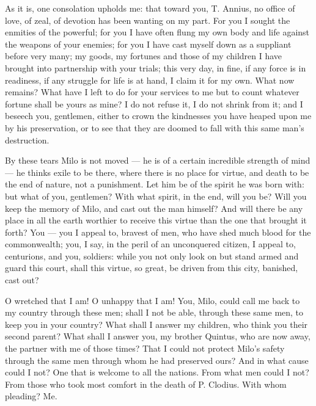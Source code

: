  As it is, one consolation upholds me: that toward you, T. Annius, no office of love, of zeal, of devotion has been wanting on my part. For you I sought the enmities of the powerful; for you I have often flung my own body and life against the weapons of your enemies; for you I have cast myself down as a suppliant before very many; my goods, my fortunes and those of my children I have brought into partnership with your trials; this very day, in fine, if any force is in readiness, if any struggle for life is at hand, I claim it for my own. What now remains? What have I left to do for your services to me but to count whatever fortune shall be yours as mine? I do not refuse it, I do not shrink from it; and I beseech you, gentlemen, either to crown the kindnesses you have heaped upon me by his preservation, or to see that they are doomed to fall with this same man's destruction.

 By these tears Milo is not moved --- he is of a certain incredible strength of mind --- he thinks exile to be there, where there is no place for virtue, and death to be the end of nature, not a punishment. Let him be of the spirit he was born with: but what of you, gentlemen? With what spirit, in the end, will you be? Will you keep the memory of Milo, and cast out the man himself? And will there be any place in all the earth worthier to receive this virtue than the one that brought it forth? You --- you I appeal to, bravest of men, who have shed much blood for the commonwealth; you, I say, in the peril of an unconquered citizen, I appeal to, centurions, and you, soldiers: while you not only look on but stand armed and guard this court, shall this virtue, so great, be driven from this city, banished, cast out?

 O wretched that I am! O unhappy that I am! You, Milo, could call me back to my country through these men; shall I not be able, through these same men, to keep you in your country? What shall I answer my children, who think you their second parent? What shall I answer you, my brother Quintus, who are now away, the partner with me of those times? That I could not protect Milo's safety through the same men through whom he had preserved ours? And in what cause could I not? One that is welcome to all the nations. From what men could I not? From those who took most comfort in the death of P. Clodius. With whom pleading? Me.

